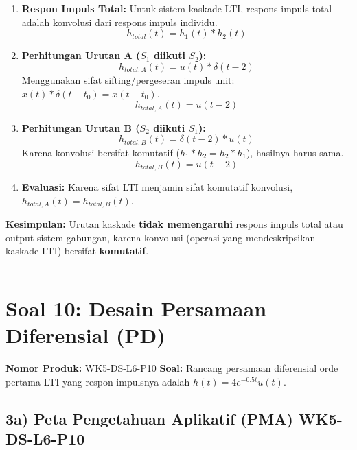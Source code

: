 \documentclass[
  letterpaper,
  DIV=11,
  numbers=noendperiod]{scrreprt}
\providecommand{\tightlist}{%
  \setlength{\itemsep}{0pt}\setlength{\parskip}{0pt}}
\begin{document}
\begin{enumerate}
\def\labelenumi{\arabic{enumi}.}
\tightlist
\item
  \textbf{Respon Impuls Total:} Untuk sistem kaskade LTI, respons impuls
  total adalah konvolusi dari respons impuls individu.
  \[h_{total}(t) = h_1(t) * h_2(t)\]
\item
  \textbf{Perhitungan Urutan A (\(S_1\) diikuti \(S_2\)):}
  \[h_{total, A}(t) = u(t) * \delta(t-2)\] Menggunakan sifat
  sifting/pergeseran impuls unit: \(x(t) * \delta(t-t_0) = x(t-t_0)\).
  \[h_{total, A}(t) = u(t-2)\]
\item
  \textbf{Perhitungan Urutan B (\(S_2\) diikuti \(S_1\)):}
  \[h_{total, B}(t) = \delta(t-2) * u(t)\] Karena konvolusi bersifat
  komutatif (\(h_1 * h_2 = h_2 * h_1\)), hasilnya harus sama.
  \[h_{total, B}(t) = u(t-2)\]
\item
  \textbf{Evaluasi:} Karena sifat LTI menjamin sifat komutatif
  konvolusi, \(h_{total, A}(t) = h_{total, B}(t)\).
\end{enumerate}

\textbf{Kesimpulan:} Urutan kaskade \textbf{tidak memengaruhi} respons
impuls total atau output sistem gabungan, karena konvolusi (operasi yang
mendeskripsikan kaskade LTI) bersifat \textbf{komutatif}.

\begin{center}\rule{0.5\linewidth}{0.5pt}\end{center}

\section{Soal 10: Desain Persamaan Diferensial
(PD)}\label{soal-10-desain-persamaan-diferensial-pd}

\textbf{Nomor Produk:} WK5-DS-L6-P10 \textbf{Soal:} Rancang persamaan
diferensial orde pertama LTI yang respon impulsnya adalah
\(h(t) = 4e^{-0.5t} u(t)\).

\subsection{3a) Peta Pengetahuan Aplikatif (PMA)
WK5-DS-L6-P10}\label{a-peta-pengetahuan-aplikatif-pma-wk5-ds-l6-p10}
\end{document}
